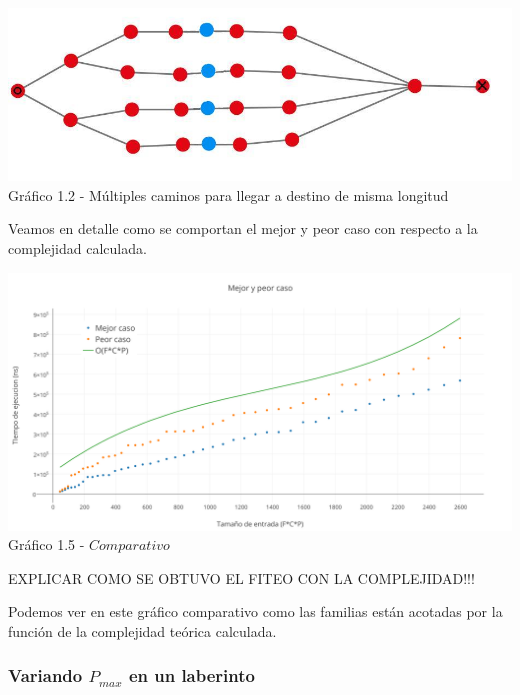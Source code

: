 \vspace*{0.3cm} \vspace*{0.3cm}
  \begin{center}
\includegraphics[scale=0.7]{./EJ1/ej1grafopeorcaso.jpeg}
{Gr\'afico 1.2 - Múltiples caminos para llegar a destino de misma longitud}
  \end{center}
  \vspace*{0.3cm}

Veamos en detalle como se comportan el mejor y peor caso con respecto a la complejidad calculada.\\

  \vspace*{0.3cm} \vspace*{0.3cm}
  \begin{center}
\includegraphics[scale=0.5]{./EJ1/MejorYPeorCaso.png}
{Gr\'afico 1.5 - $Comparativo$}
  \end{center}
  \vspace*{0.3cm}

EXPLICAR COMO SE OBTUVO EL FITEO CON LA COMPLEJIDAD!!!

Podemos ver en este gr\'afico comparativo como las familias est\'an acotadas por la funci\'on de la complejidad te\'orica calculada.\\

\subsubsection*{Variando $P_{max}$ en un laberinto}

